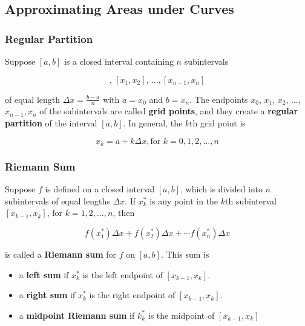 %
%
%

\subsection{Approximating Areas under Curves}
\subsubsection{Regular Partition}
Suppose $[a, b]$ is a closed interval containing $n$ subintervals

\begin{equation}
    [x_0, x_1],\, [x_1, x_2],\, \ldots, [x_{n - 1}, x_n]
\end{equation}

of equal length $\Delta x = \frac{b - a}{n}$ with $a = x_0$ and $b = x_n$. The endpoints $x_0$, $x_1$, $x_2$, $\ldots$, $x_{n - 1}, x_n$ of the subintervals are called \textbf{grid points}, and they create a \textbf{regular partition} of the interval $[a, b]$. In general, the $k$th grid point is

\begin{equation}
    x_k = a + k \Delta x,\text{for $k = 0, 1, 2, \ldots, n$}
\end{equation}

\subsubsection{Riemann Sum}
Suppose $f$ is defined on a closed interval $[a, b]$, which is divided into $n$ subintervals of equal lengths $\Delta x$. If $x_k ^*$ is any point in the $k$th subinterval $[x_{k - 1}, x_k]$, for $k = 1, 2, \ldots, n$, then 

\begin{equation}
    f(x_1 ^*) \Delta x + f(x_2 ^*) \Delta x + \cdots f(x_n ^*) \Delta x
\end{equation}

is called a \textbf{Riemann sum} for $f$ on $[a, b]$. This sum is

\begin{itemize}
    \item a \textbf{left sum} if $x_k ^*$ is the left endpoint of $[x_{k - 1}, x_k]$.
    \item a \textbf{right sum} if $x_k ^*$ is the right endpoint of $[x_{k - 1}, x_k]$.
    \item a \textbf{midpoint Riemann sum} if $k_k ^*$ is the midpoint of $[x_{k - 1}, x_k]$
\end{itemize}

